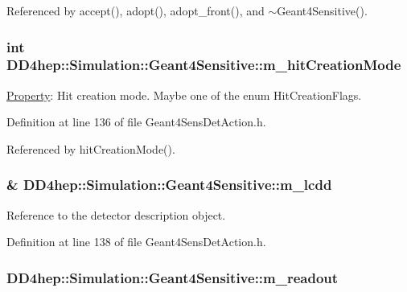 Referenced by accept(), adopt(), adopt\_\-front(), and $\sim$Geant4Sensitive().\hypertarget{class_d_d4hep_1_1_simulation_1_1_geant4_sensitive_a0dca1438c83ccee54eb9458bf12220b1}{
\subsubsection[{m\_\-hitCreationMode}]{\setlength{\rightskip}{0pt plus 5cm}int {\bf DD4hep::Simulation::Geant4Sensitive::m\_\-hitCreationMode}}}
\label{class_d_d4hep_1_1_simulation_1_1_geant4_sensitive_a0dca1438c83ccee54eb9458bf12220b1}


\hyperlink{class_d_d4hep_1_1_property}{Property}: Hit creation mode. Maybe one of the enum HitCreationFlags. 

Definition at line 136 of file Geant4SensDetAction.h.

Referenced by hitCreationMode().\hypertarget{class_d_d4hep_1_1_simulation_1_1_geant4_sensitive_af7bcfc4733d5822cb9d4b0852b121800}{
\subsubsection[{m\_\-lcdd}]{\& {\bf DD4hep::Simulation::Geant4Sensitive::m\_\-lcdd}}}
\label{class_d_d4hep_1_1_simulation_1_1_geant4_sensitive_af7bcfc4733d5822cb9d4b0852b121800}


Reference to the detector description object. 

Definition at line 138 of file Geant4SensDetAction.h.\hypertarget{class_d_d4hep_1_1_simulation_1_1_geant4_sensitive_a14b5d00feae681d434df04c0d9fc8f70}{
\subsubsection[{m\_\-readout}]{ {\bf DD4hep::Simulation::Geant4Sensitive::m\_\-readout}}}
\label{class_d_d4hep_1_1_simulation_1_1_geant4_sensitive_a14b5d00feae681d434df04c0d9fc8f70}


